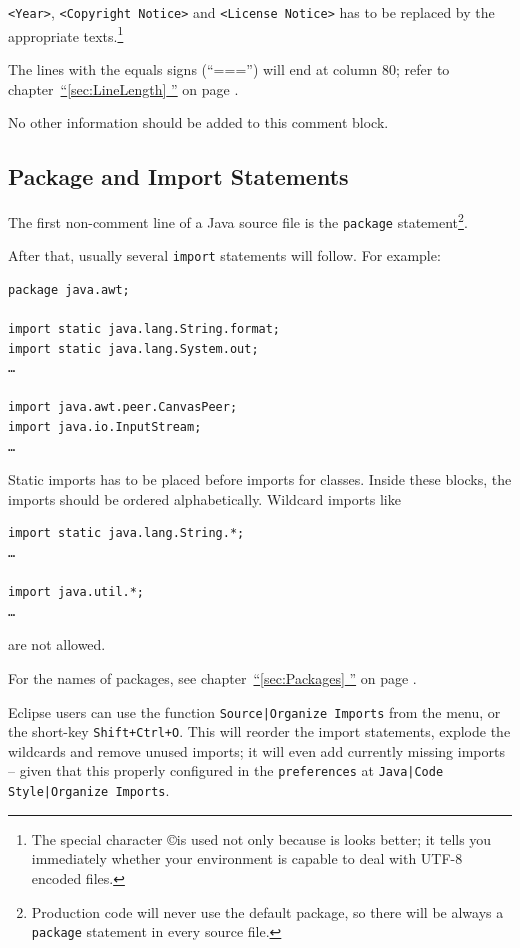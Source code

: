 \documentclass[12pt,a4paper,titlepage, parskip=half, headsepline, footsepline, cleardoubleplain]{scrbook}
\newcommand*{\tqfullvref}[1]{\hyperref[{#1}]{“\ref*{#1} \nameref*{#1}”} on page \pageref{#1}}
\begin{document}
\verb#<Year>#, \verb#<Copyright Notice># and \verb#<License Notice># has to be replaced by the appropriate texts.\footnote{The special character \copyright is used not only because is looks better; it tells you immediately whether your environment is capable to deal with UTF-8 encoded files.}

The lines with the equals signs (“===”) will end at column 80; refer to chapter~\tqfullvref{sec:LineLength}.

No other information should be added to this comment block.

\subsection{Package and Import Statements}

The first non-comment line of a Java source file is the \lstinline|package| statement\footnote{Production code will never use the default package, so there will be always a \lstinline|package| statement in every source file.}.

After that, usually several \lstinline|import| statements will follow. For example:

\begin{lstlisting}
package java.awt;

import static java.lang.String.format;
import static java.lang.System.out;
…

import java.awt.peer.CanvasPeer;
import java.io.InputStream;
…
\end{lstlisting}

Static imports has to be placed before imports for classes. Inside these blocks, the imports should be ordered alphabetically. Wildcard imports like

\begin{lstlisting}
import static java.lang.String.*;
…

import java.util.*;
…
\end{lstlisting}

are not allowed.

For the names of packages, see chapter~\tqfullvref{sec:Packages}.

Eclipse users can use the function \verb#Source|Organize Imports# from the menu, or the short-key \verb#Shift+Ctrl+O#. This will reorder the import statements, explode the wildcards and remove unused imports; it will even add currently missing imports – given that this properly configured in the \verb#preferences# at \verb#Java|Code Style|Organize Imports#.
\end{document}
